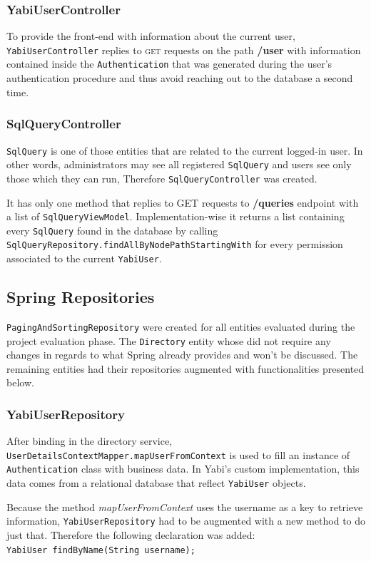 \subsubsection{YabiUserController}
To provide the front-end with information about the current user, \texttt{YabiUserController} replies to \textsc{get} requests on the path \textbf{/user} with information contained inside the \texttt{Authentication} that was generated during the user's authentication procedure and thus avoid reaching out to the database a second time.

\subsubsection{SqlQueryController}
\texttt{SqlQuery} is one of those entities that are related to the current logged-in user. In other words, administrators may see all registered \texttt{SqlQuery} and users see only those which they can run, Therefore \texttt{SqlQueryController} was created.

It has only one method that replies to \textsc{GET} requests to \textbf{/queries} endpoint with a list of \texttt{SqlQueryViewModel}. Implementation-wise it returns a list containing every \texttt{SqlQuery} found in the database by calling \texttt{SqlQueryRepository.findAllByNodePathStartingWith} for every permission associated to the current \texttt{YabiUser}.

\subsection{Spring Repositories}\label{impl:repos}
\texttt{PagingAndSortingRepository} were created for all entities evaluated during the project evaluation phase.
The \texttt{Directory} entity whose did not require any changes in regards to what Spring already provides and won't be discussed.
The remaining entities had their repositories augmented with functionalities presented below.

\subsubsection{YabiUserRepository}
After binding in the directory service, \texttt{UserDetailsContextMapper.mapUserFromContext} is used to fill an instance of \texttt{Authentication} class with business data. In \gls{Yabi}'s custom implementation, this data comes from a relational database that reflect \texttt{YabiUser} objects.

Because the method \textit{mapUserFromContext} uses the username as a key to retrieve information, \texttt{YabiUserRepository} had to be augmented with a new method to do just that. Therefore the following declaration was added:\\
\texttt{YabiUser findByName(String username);}

